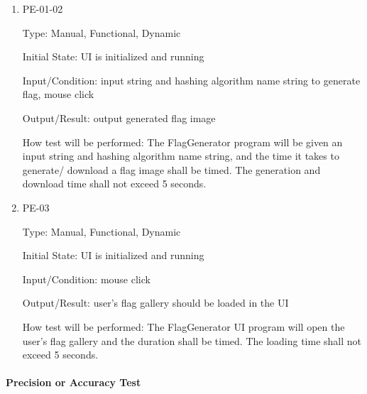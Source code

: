 \documentclass[12pt, titlepage]{article}
\begin{document}
\begin{enumerate}

\item{PE-01-02\\}

Type: Manual, Functional, Dynamic

Initial State: UI is initialized and running

Input/Condition: input string and hashing algorithm name string to generate
flag, mouse click

Output/Result: output generated flag image

How test will be performed: The FlagGenerator program will be given an input
string and hashing algorithm name string, and the time it takes to generate/
download a flag image shall be timed. The generation and download time shall
not exceed 5 seconds.

\item{PE-03\\}

Type: Manual, Functional, Dynamic

Initial State: UI is initialized and running

Input/Condition: mouse click

Output/Result: user's flag gallery should be loaded in the UI

How test will be performed: The FlagGenerator UI program will open the user's
flag gallery and the duration shall be timed. The loading time shall not
exceed 5 seconds.

\end{enumerate}

\paragraph{Precision or Accuracy Test}
\end{document}
